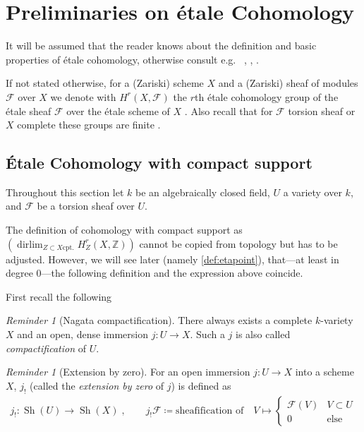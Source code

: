 \documentclass[english,headsepline=0.25pt]{scrartcl}
\theoremstyle{definition}
\theoremstyle{remark}
\newtheorem{Rev}[Def]{Reminder}
\newcommand*{\Z}{\mathds{Z}}
\newcommand*{\F}{\mathcal{F}} %
\DeclareMathOperator*{\dirlim}{dirlim} %
\DeclareMathOperator{\Sh}{Sh} %
\newcommand*{\forexample}{e.g.\ }
\begin{document}
\section{Preliminaries on étale Cohomology}
It will be assumed that the reader knows about the definition and basic
properties of étale cohomology, otherwise consult \forexample
\cite{jannsenetale}, \cite{milne}, \cite{milnebook}.

If not stated otherwise, for a (Zariski) scheme $X$ and a (Zariski)
sheaf of modules $\F$ over $X$ we denote with $H^r(X,\F)$ the $r$th
étale cohomology group of the étale sheaf $\F$ over the étale scheme
of $X$
\cite[compare][Chap.~I.6, Examples of Sheaves on $X_\text{ét}$]{milne}.
Also recall that for $\F$ torsion sheaf or $X$ complete these groups
are finite \cite[][Thm.~I.19.1]{milne}.

\subsection{Étale Cohomology with compact support}
Throughout this section let $k$ be an algebraically closed field,
$U$ a variety over $k$,
and $\F$ be a torsion sheaf over $U$.

The definition of cohomology with compact support as
$\left(\dirlim_{Z\subset X \text{cpt.}}H_Z^r(X,\Z)\right)$
cannot be copied from topology but has to be adjusted.
However, we will see later (namely \ref{def:etapoint}),
that---at least in degree 0---the following definition
and the expression above coincide.

First recall the following
\begin{Rev}[Nagata compactification]\label{nagata}
  There always exists a complete $k$-variety $X$ and an open, dense
  immersion $j\colon U\to X$. Such a $j$ is also called
  \emph{compactification} of $U$.
\end{Rev}
\begin{Rev}[Extension by zero]\label{def:extbyzero}
  For an open immersion $j\colon U\to X$ into
  a scheme $X$, $j_!$ (called the \emph{extension by zero} of $j$)
  is defined as
  \begin{gather*}
    j_!\colon \Sh(U)\to \Sh(X)\;,\qquad
    j_!\F \coloneqq \text{sheafification of}\quad
    V\mapsto\begin{cases}
      \F(V) & V\subset U\\
      0     & \text{else}
    \end{cases}
  \end{gather*}
\end{Rev}
\end{document}
